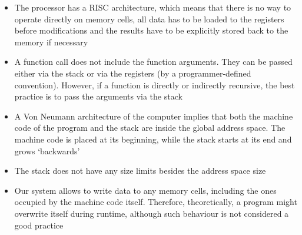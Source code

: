 \begin{itemize}
    \item The  processor has a RISC architecture, which means that there is no way to operate directly on memory cells, all data has to be loaded to the registers before modifications and the results have to be explicitly stored back to the memory if necessary
    \item A function call does not include the function arguments.
          They can be passed either via the stack or via the registers (by a programmer-defined convention).
          However, if a function is directly or indirectly recursive, the best practice is to pass the arguments via the stack
    \item A Von Neumann architecture of the  computer implies that both the machine code of the program and the stack are inside the global address space.
          The machine code is placed at its beginning, while the stack starts at its end and grows `backwards'
    \item The stack does not have any size limits besides the address space size
    \item Our system allows to write data to any memory cells, including the ones occupied by the machine code itself.
          Therefore, theoretically, a program might overwrite itself during runtime, although such behaviour is not considered a good practice
\end{itemize}
